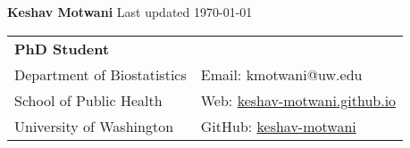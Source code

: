 \documentclass[margin,centered]{res}
\begin{document}
\noindent  \hspace{-97pt} {\LARGE{\bfseries Keshav Motwani}} \hspace*{\fill}  {\small Last updated \monthyeardate\today }\\

\vspace{-12pt}
\hspace{-95pt} \begin{tabular}{@{}p{3.4in}p{2.9in}}
\textbf{PhD Student} &  \\%
Department of Biostatistics   & \hfill Email: kmotwani@uw.edu\\
School of Public Health  & \hfill   Web: \href{https://keshav-motwani.github.io}{keshav-motwani.github.io}\\
University of Washington & \hfill  GitHub: \href{https://github.com/keshav-motwani/}{keshav-motwani}\\
\end{tabular}

\vspace{-5pt}
\end{document}
